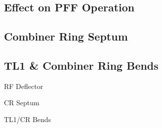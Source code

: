 \subsection{Effect on PFF Operation}
\label{ss:t566EffectPFF}



\subsection{Combiner Ring Septum}
\label{ss:crSeptum}

\subsection{TL1 \& Combiner Ring Bends}
\label{ss:crBends}


RF Deflector

CR Septum

TL1/CR Bends







